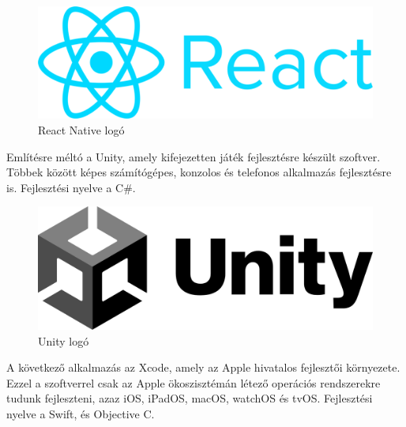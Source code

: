 \begin{figure}[h]
\centering
\includegraphics[scale=0.1]{images/reactnative.png}
\caption{React Native logó}
\label{fig:reactnative}
\end{figure}

Említésre méltó a Unity\cite{Unity}, amely kifejezetten játék fejlesztésre készült szoftver.
Többek között képes számítógépes, konzolos és telefonos alkalmazás fejlesztésre is.
Fejlesztési nyelve a C\#.

\begin{figure}[h]
\centering
\includegraphics[scale=0.12]{images/unity.png}
\caption{Unity logó}
\label{fig:unity}
\end{figure}

A következő alkalmazás az Xcode\cite{Xcode}, amely az Apple hivatalos fejlesztői környezete.
Ezzel a szoftverrel csak az Apple ökoszisztémán létező operációs rendszerekre tudunk fejleszteni,
azaz iOS, iPadOS, macOS, watchOS és tvOS. Fejlesztési nyelve a Swift, és Objective C.


